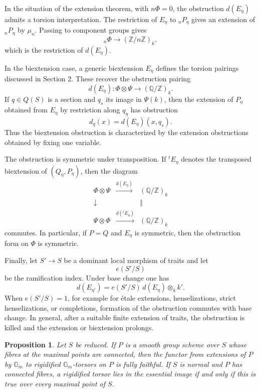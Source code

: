 \documentclass[11pt]{article}
\theoremstyle{plain}
\newtheorem{proposition}[theorem]{Proposition}
\theoremstyle{definition}
\theoremstyle{remark}
\newcommand{\bQ}{\mathbb Q}
\newcommand{\bZ}{\mathbb Z}
\newcommand{\Gm}{\mathbb G_m}
\begin{document}
In the situation of the extension theorem, with \(n\Phi=0\), the obstruction
\(d(E_\eta)\) admits a torsion interpretation. The restriction of \(E_\eta\) to
\({}_nP_\eta\) gives an extension of \({}_nP_\eta\) by \(\mu_n\). Passing to
component groups gives
\[
{}_n\Phi\longrightarrow (\bZ/n\bZ)_k,
\]
which is the restriction of \(d(E_\eta)\).

In the biextension case, a generic biextension \(E_\eta\) defines the torsion
pairings discussed in Section 2. These recover the obstruction pairing
\[
d(E_\eta):\Phi\otimes\Psi\to(\bQ/\bZ)_k.
\]
If \(q\in Q(S)\) is a section and \(q_s\) its image in \(\Psi(k)\), then the
extension of \(P_\eta\) obtained from \(E_\eta\) by restriction along \(q_\eta\)
has obstruction
\[
d_q(x)=d(E_\eta)(x,q_s).
\]
Thus the biextension obstruction is characterized by the extension obstructions
obtained by fixing one variable.

The obstruction is symmetric under transposition. If \({}^tE_\eta\) denotes the
transposed biextension of \((Q_\eta,P_\eta)\), then the diagram
\[
\begin{array}{ccc}
\Phi\otimes\Psi & \xrightarrow{d(E_\eta)} & (\bQ/\bZ)_k\\
\downarrow & & \Vert\\
\Psi\otimes\Phi & \xrightarrow{d({}^tE_\eta)} & (\bQ/\bZ)_k
\end{array}
\]
commutes. In particular, if \(P=Q\) and \(E_\eta\) is symmetric, then the
obstruction form on \(\Phi\) is symmetric.

Finally, let \(S'\to S\) be a dominant local morphism of traits and let
\[
e(S'/S)
\]
be the ramification index. Under base change one has
\[
d(E_{\eta'})=e(S'/S)\, d(E_\eta)\otimes_k k'.
\]
When \(e(S'/S)=1\), for example for étale extensions, henselizations, strict
henselizations, or completions, formation of the obstruction commutes with base
change. In general, after a suitable finite extension of traits, the obstruction
is killed and the extension or biextension prolongs.

\begin{proposition}
Let \(S\) be reduced. If \(P\) is a smooth group scheme over \(S\) whose fibres
at the maximal points are connected, then the functor from extensions of \(P\)
by \(\Gm\) to rigidified \(\Gm\)-torsors on \(P\) is fully faithful. If \(S\) is
normal and \(P\) has connected fibres, a rigidified torsor lies in the essential
image if and only if this is true over every maximal point of \(S\).
\end{proposition}
\end{document}
